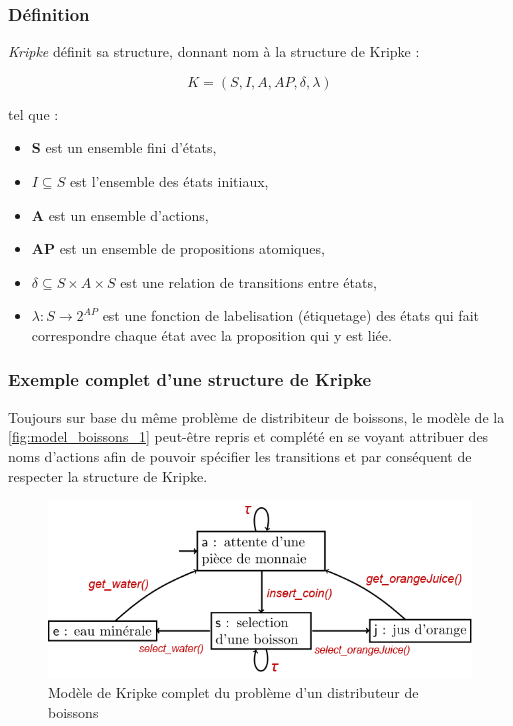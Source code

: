 \documentclass[runningheads,a4paper,10pt]{llncs}
\begin{document}
\subsubsection{Définition} 

\textit{Kripke} définit sa structure, donnant nom à la structure de Kripke \cite{Kripke} : 

$$\boxed{\textit{K} = (S,I,A,AP,\delta,\lambda)}$$ 


\noindent
tel que : 
\begin{itemize}
\item \textbf{S} est un ensemble fini d'états, \\
\item \boldmath$I \subseteq S$ est l'ensemble des états initiaux, \\
\item \textbf{A} est un ensemble d'actions, \\
\item \textbf{AP} est un ensemble de propositions atomiques, \\
\item \boldmath$\delta \subseteq S \times A \times S$ est une relation de transitions entre états, \\
\item \boldmath$\lambda : S \rightarrow 2^{AP}$ est une fonction de labelisation (étiquetage) des états qui fait correspondre chaque état avec la proposition qui y est liée.  
\end{itemize}

\subsubsection{Exemple complet d'une structure de Kripke} 

Toujours sur base du même problème de distribiteur de boissons, le modèle de la \autoref{fig:model_boissons_1} peut-être repris et complété en se voyant attribuer des noms d'actions afin de pouvoir spécifier les transitions et par conséquent de respecter la structure de Kripke. 

\begin{figure}
  \centering
   \includegraphics[scale=0.5]{figures/model-boissons-2.png}
   \caption[Caption for LOF]{Modèle de Kripke complet du problème d'un distributeur de boissons}
   \label{fig:model_boissons_2}
\end{figure}
\end{document}
